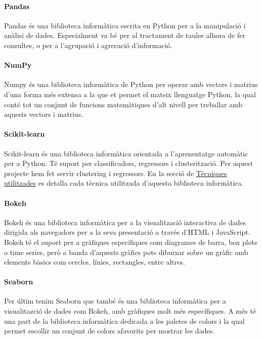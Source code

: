 \documentclass[12pt,a4paper,catalan]{article}
\begin{document}
\hypertarget{pandas}{
	\paragraph{Pandas}
}
Pandas és una biblioteca informàtica escrita en Python per a la manipulació i anàlisi de dades. Especialment va bé per al tractament de taules alhora de fer consultes, o per a l'agrupació i agrecació d'informació.

\hypertarget{numpy}{
	\paragraph{NumPy}
}
Numpy és una biblioteca informàtica de Python per operar amb vectors i matrius d'una forma més extensa a la que et permet el mateix llenguatge Python, la qual conté tot un conjunt de funcions matemàtiques d'alt nivell per treballar amb aquests vectors i matrius.

\hypertarget{sklearn}{
	\paragraph{Scikit-learn}
}
Scikit-learn és una biblioteca informàtica orientada a l'aprenentatge automàtic per a Python. Té suport per classificadors, regressors i clusterització. Per aquest projecte hem fet servir clustering i regressors. En la secció de \hyperlink{tecniquesutilitzades}{Tècniques utilitzades} es detalla cada tècnica utilitzada d'aquesta biblioteca informàtica.

\paragraph{Bokeh}
Bokeh és una biblioteca informàtica per a la visualització interactiva de dades dirigida als navegadors per a la seva presentació a través d'HTML i JavaScript. Bokeh té el suport per a gràfiques específiques com diagrames de barra, box plots o time series, però a banda d'aquests gràfics pots dibuixar sobre un gràfic amb elements bàsics com cercles, línies, rectangles, entre altres.

\paragraph{Seaborn}
Per últim tenim Seaborn que també és una biblioteca informàtica per a visualitazció de dades com Bokeh, amb gràfiques molt més específiques. A més té una part de la biblioteca informàtica dedicada a les paletes de colors i la qual permet escollir un conjunt de colors afavorits per mostrar les dades.
\end{document}

